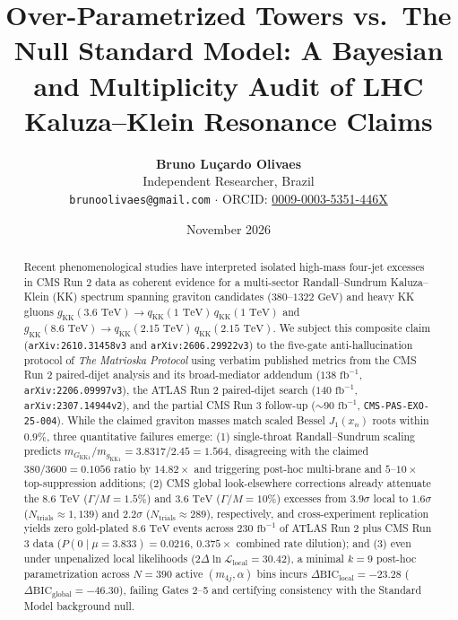 \documentclass[11pt,a4paper]{article}
\title{\textbf{Over-Parametrized Towers vs.\ The Null Standard Model: A Bayesian and Multiplicity Audit of LHC Kaluza--Klein Resonance Claims}}
\author{
    \textbf{Bruno Lu\c{c}ardo Olivaes}\\[0.2cm]
    \small Independent Researcher, Brazil\\
    \small \texttt{brunoolivaes@gmail.com} $\cdot$ ORCID: \href{https://orcid.org/0009-0003-5351-446X}{0009-0003-5351-446X}
}
\date{November 2026}
\begin{document}
\maketitle

\begin{abstract}
Recent phenomenological studies have interpreted isolated high-mass four-jet excesses in CMS Run 2 data as coherent evidence for a multi-sector Randall--Sundrum Kaluza--Klein (KK) spectrum spanning graviton candidates ($380\text{--}1322\text{ GeV}$) and heavy KK gluons $g_{\mathrm{KK}}(3.6\text{ TeV}) \to q_{\mathrm{KK}}(1\text{ TeV})\,q_{\mathrm{KK}}(1\text{ TeV})$ and $g_{\mathrm{KK}}(8.6\text{ TeV}) \to q_{\mathrm{KK}}(2.15\text{ TeV})\,q_{\mathrm{KK}}(2.15\text{ TeV})$. We subject this composite claim (\texttt{arXiv:2610.31458v3} and \texttt{arXiv:2606.29922v3}) to the five-gate anti-hallucination protocol of \emph{The Matrioska Protocol} using verbatim published metrics from the CMS Run 2 paired-dijet analysis and its broad-mediator addendum ($138\text{ fb}^{-1}$, \texttt{arXiv:2206.09997v3}), the ATLAS Run 2 paired-dijet search ($140\text{ fb}^{-1}$, \texttt{arXiv:2307.14944v2}), and the partial CMS Run 3 follow-up ($\sim 90\text{ fb}^{-1}$, \texttt{CMS-PAS-EXO-25-004}). While the claimed graviton masses match scaled Bessel $J_1(x_n)$ roots within $0.9\%$, three quantitative failures emerge: (1) single-throat Randall--Sundrum scaling predicts $m_{G_{\mathrm{KK}1}}/m_{g_{\mathrm{KK}1}} = 3.8317/2.45 = 1.564$, disagreeing with the claimed $380/3600 = 0.1056$ ratio by $14.82\times$ and triggering post-hoc multi-brane and $5\text{--}10\times$ top-suppression additions; (2) CMS global look-elsewhere corrections already attenuate the $8.6\text{ TeV}$ ($\Gamma/M = 1.5\%$) and $3.6\text{ TeV}$ ($\Gamma/M = 10\%$) excesses from $3.9\sigma$ local to $1.6\sigma$ ($N_{\mathrm{trials}} \approx 1{,}139$) and $2.2\sigma$ ($N_{\mathrm{trials}} \approx 289$), respectively, and cross-experiment replication yields zero gold-plated $8.6\text{ TeV}$ events across $230\text{ fb}^{-1}$ of ATLAS Run 2 plus CMS Run 3 data ($P(0 \mid \mu = 3.833) = 0.0216$, $0.375\times$ combined rate dilution); and (3) even under unpenalized local likelihoods ($2\Delta\ln\mathcal{L}_{\mathrm{local}} = 30.42$), a minimal $k = 9$ post-hoc parametrization across $N = 390$ active $(m_{4j},\alpha)$ bins incurs $\Delta\mathrm{BIC}_{\mathrm{local}} = -23.28$ ($\Delta\mathrm{BIC}_{\mathrm{global}} = -46.30$), failing Gates 2--5 and certifying consistency with the Standard Model background null.
\end{abstract}
\end{document}

